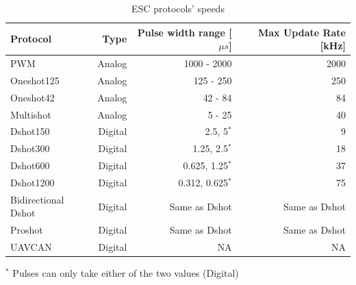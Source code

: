 \begin{table}
\begin{center}
 \caption{ESC protocols' speeds}\vspace{1ex}
 \label{tab:tab_esc_prot}
 \begin{tabular}{l|rrr}
 \hline
Protocol & Type & Pulse width range [$\mu s$]  & Max Update Rate [kHz] \\ \hline \hline
PWM                 & Analog & 1000 - 2000      & 2000\\
Oneshot125          & Analog & 125 - 250        & 250\\
Oneshot42           & Analog & 42 - 84          & 84\\
Multishot           & Analog & 5 - 25           & 40\\
Dshot150            & Digital & 2.5, 5$^*$          & 9\\
Dshot300            & Digital & 1.25, 2.5$^*$       & 18\\
Dshot600            & Digital & 0.625, 1.25$^*$     & 37\\
Dshot1200           & Digital & 0.312, 0.625$^*$    & 75\\
Bidirectional Dshot & Digital & Same as Dshot   & Same as Dshot \\
Proshot             & Digital & Same as Dshot   & Same as Dshot\\
UAVCAN              & Digital & NA              & NA\\
 \end{tabular}
\end{center}
\footnotesize{$^*$ Pulses can only take either of the two values (Digital)}
\end{table}



